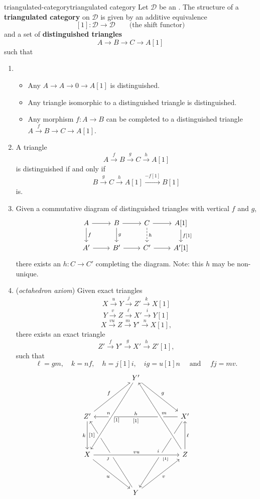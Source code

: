 \begin{topic}{triangulated-category}{triangulated category}
    Let $\mathcal{D}$ be an . The structure of a \textbf{triangulated category} on $\mathcal{D}$ is given by an additive equivalence
    \[ [1] \colon \mathcal{D} \to \mathcal{D} \qquad \text{(the shift functor)} \]
    and a set of \textbf{distinguished triangles}
    \[ A \to B \to C \to A[1] \]
    such that
    \begin{enumerate}[label=(\arabic*)]
        \item \begin{itemize}
            \item Any $A \to A \to 0 \to A[1]$ is distinguished.
            \item Any triangle isomorphic to a distinguished triangle is distinguished.
            \item Any morphism $f \colon A \to B$ can be completed to a distinguished triangle $A \overset{f}{\to} B \to C \to A[1]$.
        \end{itemize}
        \item A triangle
        \[ A \xrightarrow{f} B \xrightarrow{g} C \xrightarrow{h} A[1] \]
        is distinguished if and only if
        \[ B \xrightarrow{g} C \xrightarrow{h} A[1] \xrightarrow{-f[1]} B[1] \]
        is.
        \item Given a commutative diagram of distinguished triangles with vertical $f$ and $g$,
        \[ \svg \begin{tikzcd}
            A \arrow{r} \arrow{d}{f} & B \arrow{r} \arrow{d}{g} & C \arrow{r} \arrow[dashed]{d}{h} & A[1] \arrow{d}{f[1]} \\
            A' \arrow{r} & B' \arrow{r} & C' \arrow{r} & A'[1]
        \end{tikzcd} \]
        there exists an $h \colon C \to C'$ completing the diagram. Note: this $h$ may be non-unique.
        \item (\textit{octahedron axiom}) Given exact triangles
        \[ X \xrightarrow{u} Y \xrightarrow{j} Z' \xrightarrow{k} X[1] \]
        \[ Y \xrightarrow{v} Z \xrightarrow{\ell} X' \xrightarrow{i} Y[1] \]
        \[ X \xrightarrow{vu} Z \xrightarrow{m} Y' \xrightarrow{n} X[1] , \]
        there exists an exact triangle
        \[ Z' \xrightarrow{f} Y' \xrightarrow{g} X' \xrightarrow{h} Z'[1] , \]
        such that 
        \[ \ell = gm, \quad k = nf, \quad h = j[1]i, \quad ig = u[1]n \quad \text{ and } \quad fj = mv . \]
        \[ \svg \begin{tikzcd}[row sep=4em, column sep=5em] & Y' \arrow{rd}{g} & \\ Z' \arrow{ur}{f} \arrow[d, swap,"k","{[}1{]}"'] \ar[from=ddr, crossing over]{}{j} & & X' \arrow[ddl, swap, "i", "{[}1{]}"'] \arrow[ll, "h"',"{[}1{]}"] \\ X \arrow[swap]{dr}{u} \arrow[crossing over]{rr}{vu} \arrow[swap, from=uur, crossing over, "n", "{[}1{]}"'] & & Z \arrow[swap]{u}{\ell} \arrow[crossing over, swap]{uul}{m} \\ & Y \arrow[swap]{ur}{v} & \end{tikzcd} \]
    \end{enumerate}
\end{topic}

